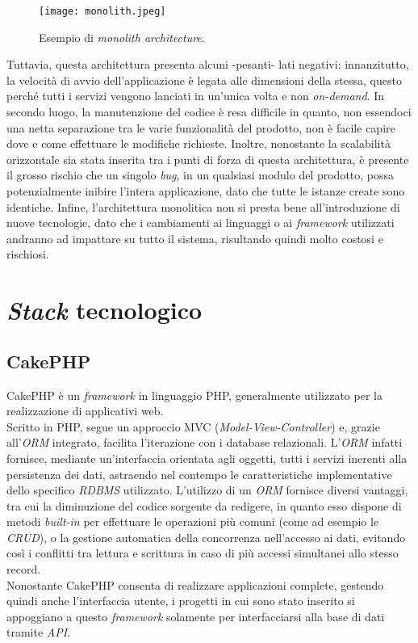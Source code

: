 \begin{figure}[h]
\texttt{[image: monolith.jpeg]}
\centering
\caption{Esempio di \textit{monolith architecture}.}
\label{fig:monolith}
\end{figure}

Tuttavia, questa architettura presenta alcuni -pesanti- lati negativi: innanzitutto, la velocità di avvio dell'applicazione è legata alle dimensioni della stessa, questo perché tutti i servizi vengono lanciati in un'unica volta e non \textit{on-demand}. In secondo luogo, la manutenzione del codice è resa difficile in quanto, non essendoci una netta separazione tra le varie funzionalità del prodotto, non è facile capire dove e come effettuare le modifiche richieste. Inoltre, nonostante la scalabilità orizzontale sia stata inserita tra i punti di forza di questa architettura, è presente il grosso rischio che un singolo \textit{bug}, in un qualsiasi modulo del prodotto, possa potenzialmente inibire l'intera applicazione, dato che tutte le istanze create sono identiche.
Infine, l'architettura monolitica non si presta bene all'introduzione di nuove tecnologie, dato che i cambiamenti ai linguaggi o ai \textit{framework} utilizzati andranno ad impattare su tutto il sistema, risultando quindi molto costosi e rischiosi.

\section{\textit{Stack} tecnologico}
\subsection{CakePHP}
CakePHP è un \textit{framework} in linguaggio PHP, generalmente utilizzato per la realizzazione di applicativi web.\\
Scritto in PHP, segue un approccio MVC (\textit{Model-View-Controller}) e, grazie all'\textit{ORM} integrato, facilita l'iterazione con i database relazionali. L'\textit{ORM} infatti fornisce, mediante un'interfaccia orientata agli oggetti, tutti i servizi inerenti alla persistenza dei dati, astraendo nel contempo le caratteristiche implementative dello specifico \textit{RDBMS} utilizzato. L'utilizzo di un \textit{ORM} fornisce diversi vantaggi, tra cui la diminuzione del codice sorgente da redigere, in quanto esso dispone di metodi \textit{built-in} per effettuare le operazioni più comuni (come ad esempio le \textit{CRUD}), o la gestione automatica della concorrenza nell'accesso ai dati, evitando così i conflitti tra lettura e scrittura in caso di più accessi simultanei allo stesso record.\\
Nonostante CakePHP consenta di realizzare applicazioni complete, gestendo quindi anche l'interfaccia utente, i progetti in cui sono stato inserito si appoggiano a questo \textit{framework} solamente per interfacciarsi alla base di dati tramite \textit{API}.
